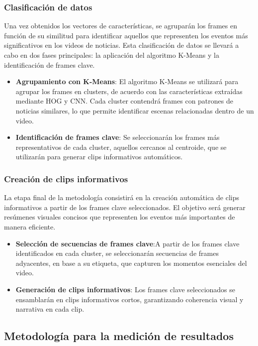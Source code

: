 \subsubsection{Clasificación de datos}
Una vez obtenidos los vectores de características, se agruparán los frames en función de su similitud para identificar aquellos que representen los eventos más significativos en los videos de noticias. Esta clasificación de datos se llevará a cabo en dos fases principales: la aplicación del algoritmo K-Means y la identificación de frames clave.

\begin{itemize}
    \item \textbf{Agrupamiento con K-Means}: El algoritmo K-Means se utilizará para agrupar los frames en clusters, de acuerdo con las características extraídas mediante HOG y CNN. Cada cluster contendrá frames con patrones de noticias similares, lo que permite identificar escenas relacionadas dentro de un video.
    \item \textbf{Identificación de frames clave}: Se seleccionarán los frames más representativos de cada cluster, aquellos cercanos al centroide, que se utilizarán para generar clips informativos automáticos.
\end{itemize}

\subsubsection{Creación de clips informativos}
La etapa final de la metodología consistirá en la creación automática de clips informativos a partir de los frames clave seleccionados. El objetivo será generar resúmenes visuales concisos que representen los eventos más importantes de manera eficiente.

\begin{itemize}
    \item \textbf{Selección de secuencias de frames clave}:A partir de los frames clave identificados en cada cluster, se seleccionarán secuencias de frames adyacentes, en base a su etiqueta, que capturen los momentos esenciales del video.
    \item \textbf{Generación de clips informativos}: Los frames clave seleccionados se ensamblarán en clips informativos cortos, garantizando coherencia visual y narrativa en cada clip.
\end{itemize}




\subsection{Metodología para la medición de resultados}

